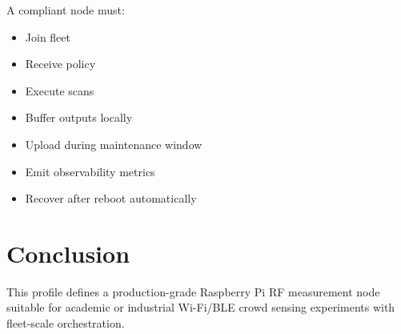 \documentclass[11pt,a4paper]{article}
\begin{document}
A compliant node must:

\begin{itemize}
\item Join fleet
\item Receive policy
\item Execute scans
\item Buffer outputs locally
\item Upload during maintenance window
\item Emit observability metrics
\item Recover after reboot automatically
\end{itemize}

\section{Conclusion}

This profile defines a production-grade Raspberry Pi RF measurement node suitable for academic or industrial Wi-Fi/BLE crowd sensing experiments with fleet-scale orchestration.
\end{document}
